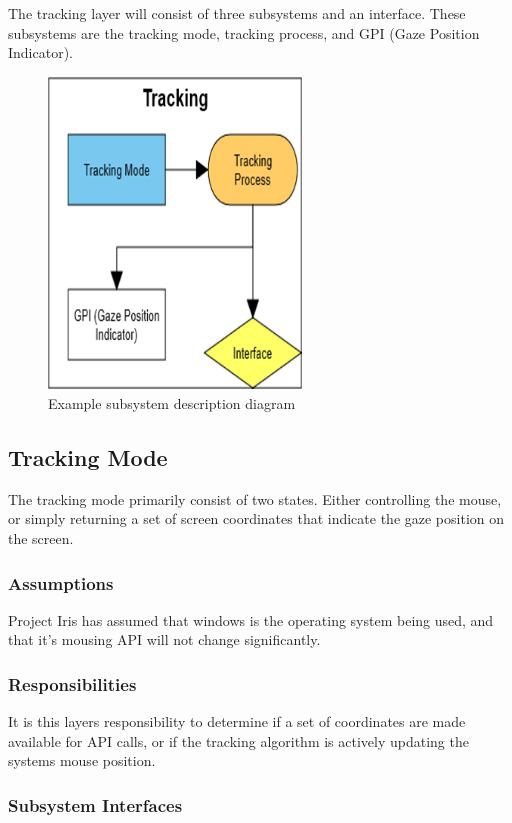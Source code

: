 The tracking layer will consist of three subsystems and an interface. These subsystems are the tracking mode, tracking process, and GPI (Gaze Position Indicator).

\begin{figure}[h!]
	\centering
	\includegraphics[width=0.60\textwidth]{images/tracking}
	\caption{Example subsystem description diagram}
\end{figure}

\subsection{Tracking Mode}
The tracking mode primarily consist of two states. Either controlling the mouse, or simply returning a set of screen coordinates that indicate the gaze position on the screen.

\subsubsection{Assumptions}
Project Iris has assumed that windows is the operating system being used, and that it's mousing API will not change significantly.

\subsubsection{Responsibilities}
It is this layers responsibility to determine if a set of coordinates are made available for API calls, or if the tracking algorithm is actively updating the systems mouse position.

\subsubsection{Subsystem Interfaces}

